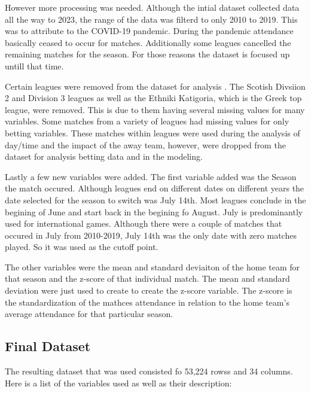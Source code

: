 \documentclass[
  letterpaper,
  DIV=11,
  numbers=noendperiod]{scrartcl}
\begin{document}
However more processing was needed. Although the intial dataset
collected data all the way to 2023, the range of the data was filterd to
only 2010 to 2019. This was to attribute to the COVID-19 pandemic.
During the pandemic attendance basically ceased to occur for matches.
Additionally some leagues cancelled the remaining matches for the
season. For those reasons the dataset is focused up untill that time.

Certain leagues were removed from the dataset for analysis . The Scotish
Divsiion 2 and Division 3 leagues as well as the Ethniki Katigoria,
which is the Greek top league, were removed. This is due to them having
several missing values for many variables. Some matches from a variety
of leagues had missing values for only betting variables. These matches
within leagues were used during the analysis of day/time and the impact
of the away team, however, were dropped from the dataset for analysis
betting data and in the modeling.

Lastly a few new variables were added. The first variable added was the
Season the match occured. Although leagues end on different dates on
different years the date selected for the season to switch was July
14th. Most leagues conclude in the begining of June and start back in
the begining fo August. July is predominantly used for international
games. Although there were a couple of matches that occured in July from
2010-2019, July 14th was the only date with zero matches played. So it
was used as the cutoff point.

The other variables were the mean and standard deviaiton of the home
team for that season and the z-score of that individual match. The mean
and standard deviation were just used to create to create the z-score
variable. The z-score is the standardization of the mathces attendance
in relation to the home team's average attendance for that particular
season.

\hypertarget{final-dataset}{%
\subsection{Final Dataset}\label{final-dataset}}

The resulting dataset that was used consisted fo 53,224 rowss and 34
columns. Here is a list of the variables used as well as their
description:
\end{document}
